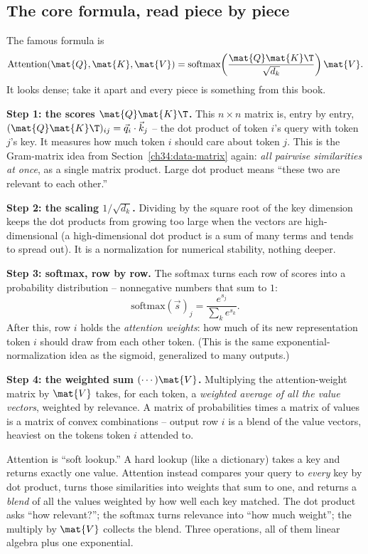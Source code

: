 \subsection{The core formula, read piece by piece}

The famous formula is
\[
\text{Attention}(\mat{Q},\mat{K},\mat{V}) =
\text{softmax}\!\left(\frac{\mat{Q}\mat{K}\T}{\sqrt{d_k}}\right)\mat{V}.
\]
It looks dense; take it apart and every piece is something from this book.

\textbf{Step 1: the scores $\mat{Q}\mat{K}\T$.} This $n\times n$ matrix is, entry by entry,
$(\mat{Q}\mat{K}\T)_{ij} = \vec{q}_i \cdot \vec{k}_j$ -- the dot product of token $i$'s
query with token $j$'s key. It measures how much token $i$ should care about token $j$.
This is the Gram-matrix idea from Section~\ref{ch34:data-matrix} again: \emph{all pairwise
similarities at once}, as a single matrix product. Large dot product means ``these two are
relevant to each other.''

\textbf{Step 2: the scaling $1/\sqrt{d_k}$.} Dividing by the square root of the key
dimension keeps the dot products from growing too large when the vectors are
high-dimensional (a high-dimensional dot product is a sum of many terms and tends to
spread out). It is a normalization for numerical stability, nothing deeper.

\textbf{Step 3: softmax, row by row.} The softmax turns each row of scores into a
probability distribution -- nonnegative numbers that sum to $1$:
\[
\text{softmax}(\vec{s})_j = \frac{e^{s_j}}{\sum_k e^{s_k}}.
\]
After this, row $i$ holds the \emph{attention weights}: how much of its new representation
token $i$ should draw from each other token. (This is the same exponential-normalization
idea as the sigmoid, generalized to many outputs.)

\textbf{Step 4: the weighted sum $(\cdots)\mat{V}$.} Multiplying the attention-weight
matrix by $\mat{V}$ takes, for each token, a \emph{weighted average of all the value
vectors}, weighted by relevance. A matrix of probabilities times a matrix of values is a
matrix of convex combinations -- output row $i$ is a blend of the value vectors, heaviest
on the tokens token $i$ attended to.

\begin{intuitionbox}
Attention is ``soft lookup.'' A hard lookup (like a dictionary) takes a key and returns
exactly one value. Attention instead compares your query to \emph{every} key by dot
product, turns those similarities into weights that sum to one, and returns a
\emph{blend} of all the values weighted by how well each key matched. The dot product
asks ``how relevant?''; the softmax turns relevance into ``how much weight''; the
multiply by $\mat{V}$ collects the blend. Three operations, all of them linear algebra
plus one exponential.
\end{intuitionbox}

